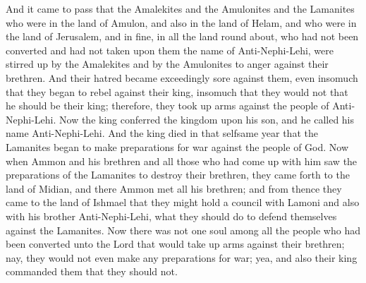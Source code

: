 And it came to pass that the Amalekites and the Amulonites and the Lamanites who were in the land of Amulon, and also in the land of Helam, and who were in the land of Jerusalem, and in fine, in all the land round about, who had not been converted and had not taken upon them the name of Anti-Nephi-Lehi, were stirred up by the Amalekites and by the Amulonites to anger against their brethren.
\bverse \iffalse And their hatred became exceedingly sore against them, even insomuch that they began to rebel against their king, insomuch that they would not that he should be their king; therefore, they took up arms against the people of Anti-Nephi-Lehi. \fi
And their hatred became exceedingly sore against them, even insomuch that they began to rebel against their king, insomuch that they would not that he should be their king; therefore, they took up arms against the people of Anti-Nephi-Lehi.
\bverse \iffalse Now the king conferred the kingdom upon his son, and he called his name Anti-Nephi-Lehi. \fi
Now the king conferred the kingdom upon his son, and he called his name Anti-Nephi-Lehi.
\bverse \iffalse And the king died in that selfsame year that the Lamanites began to make preparations for war against the people of God. \fi
And the king died in that selfsame year that the Lamanites began to make preparations for war against the people of God.
\bverse \iffalse Now when Ammon and his brethren and all those who had come up with him saw the preparations of the Lamanites to destroy their brethren, they came forth to the land of Midian, and there Ammon met all his brethren; and from thence they came to the land of Ishmael that they might hold a council with Lamoni and also with his brother Anti-Nephi-Lehi, what they should do to defend themselves against the Lamanites. \fi
Now when Ammon and his brethren and all those who had come up with him saw the preparations of the Lamanites to destroy their brethren, they came forth to the land of Midian, and there Ammon met all his brethren; and from thence they came to the land of Ishmael that they might hold a council with Lamoni and also with his brother Anti-Nephi-Lehi, what they should do to defend themselves against the Lamanites.
\bverse \iffalse Now there was not one soul among all the people who had been converted unto the Lord that would take up arms against their brethren; nay, they would not even make any preparations for war; yea, and also their king commanded them that they should not. \fi
Now there was not one soul among all the people who had been converted unto the Lord that would take up arms against their brethren; nay, they would not even make any preparations for war; yea, and also their king commanded them that they should not.
